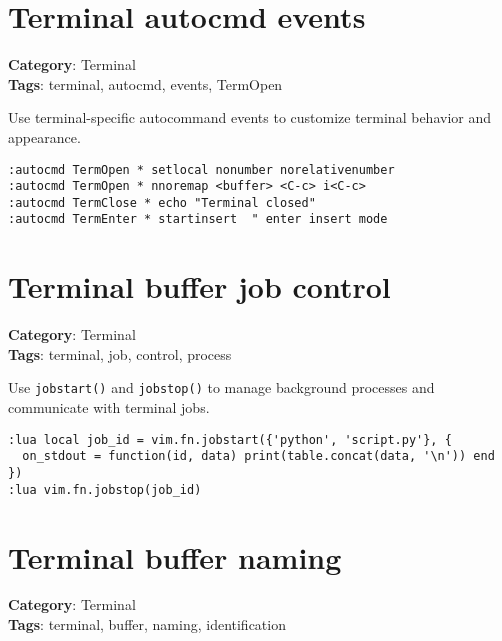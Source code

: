 {{{{{{{{{{\section{Terminal autocmd events}

\textbf{Category}: Terminal\\ \textbf{Tags}: terminal, autocmd, events, TermOpen
\vspace{0.5cm}

Use terminal-specific autocommand events to customize terminal behavior and appearance.

\begin{Exa*}{}
\begin{Verbatim}[fontsize=\footnotesize, breaklines, breakanywhere]
:autocmd TermOpen * setlocal nonumber norelativenumber
:autocmd TermOpen * nnoremap <buffer> <C-c> i<C-c>
:autocmd TermClose * echo "Terminal closed"
:autocmd TermEnter * startinsert  " enter insert mode
\end{Verbatim}
\end{Exa*}

\section{Terminal buffer job control}

\textbf{Category}: Terminal\\ \textbf{Tags}: terminal, job, control, process
\vspace{0.5cm}

Use {\footnotesize \Verb§jobstart()§} and {\footnotesize \Verb§jobstop()§} to manage background processes and communicate with terminal jobs.

\begin{Exa*}{}
\begin{Verbatim}[fontsize=\footnotesize, breaklines, breakanywhere]
:lua local job_id = vim.fn.jobstart({'python', 'script.py'}, {
  on_stdout = function(id, data) print(table.concat(data, '\n')) end
})
:lua vim.fn.jobstop(job_id)
\end{Verbatim}
\end{Exa*}

\section{Terminal buffer naming}

\textbf{Category}: Terminal\\ \textbf{Tags}: terminal, buffer, naming, identification
\vspace{0.5cm}

}}}}}}}}}}
